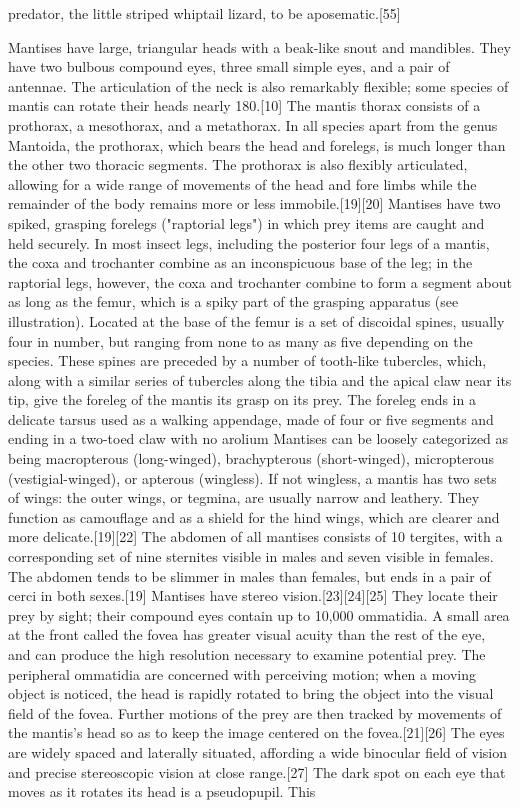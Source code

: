\documentclass[twoside, 12pt, letterpaper]{report}\usepackage[]{graphicx}\usepackage[]{color}
\begin{document}
\begin{multicols*}{2}
predator, the little striped whiptail lizard, to be aposematic.[55]






\nsubsection{\mantis}
Mantises have large, triangular heads with a beak-like snout and mandibles. They have two bulbous compound eyes, three small simple eyes, and a pair of antennae. The articulation of the neck is also remarkably flexible; some species of mantis can rotate their heads nearly 180.[10] The mantis thorax consists of a prothorax, a mesothorax, and a metathorax. In all species apart from the genus Mantoida, the prothorax, which bears the head and forelegs, is much longer than the other two thoracic segments. The prothorax is also flexibly articulated, allowing for a wide range of movements of the head and fore limbs while the remainder of the body remains more or less immobile.[19][20] Mantises have two spiked, grasping forelegs ("raptorial legs") in which prey items are caught and held securely. In most insect legs, including the posterior four legs of a mantis, the coxa and trochanter combine as an inconspicuous base of the leg; in the raptorial legs, however, the coxa and trochanter combine to form a segment about as long as the femur, which is a spiky part of the grasping apparatus (see illustration). Located at the base of the femur is a set of discoidal spines, usually four in number, but ranging from none to as many as five depending on the species. These spines are preceded by a number of tooth-like tubercles, which, along with a similar series of tubercles along the tibia and the apical claw near its tip, give the foreleg of the mantis its grasp on its prey. The foreleg ends in a delicate tarsus used as a walking appendage, made of four or five segments and ending in a two-toed claw with no arolium Mantises can be loosely categorized as being macropterous (long-winged), brachypterous (short-winged), micropterous (vestigial-winged), or apterous (wingless). If not wingless, a mantis has two sets of wings: the outer wings, or tegmina, are usually narrow and leathery. They function as camouflage and as a shield for the hind wings, which are clearer and more delicate.[19][22] The abdomen of all mantises consists of 10 tergites, with a corresponding set of nine sternites visible in males and seven visible in females. The abdomen tends to be slimmer in males than females, but ends in a pair of cerci in both sexes.[19] Mantises have stereo vision.[23][24][25] They locate their prey by sight; their compound eyes contain up to 10,000 ommatidia. A small area at the front called the fovea has greater visual acuity than the rest of the eye, and can produce the high resolution necessary to examine potential prey. The peripheral ommatidia are concerned with perceiving motion; when a moving object is noticed, the head is rapidly rotated to bring the object into the visual field of the fovea. Further motions of the prey are then tracked by movements of the mantis's head so as to keep the image centered on the fovea.[21][26] The eyes are widely spaced and laterally situated, affording a wide binocular field of vision and precise stereoscopic vision at close range.[27] The dark spot on each eye that moves as it rotates its head is a pseudopupil. This 
\end{multicols*}
\end{document}

